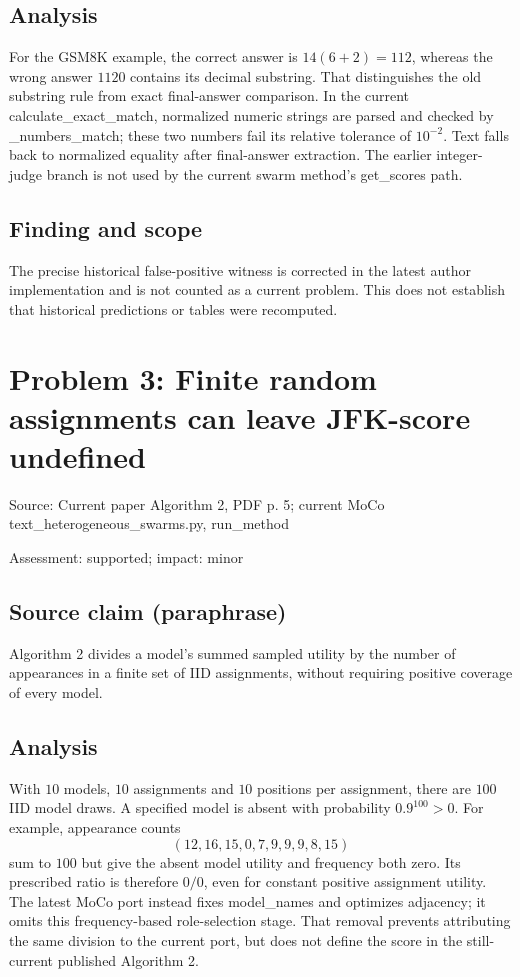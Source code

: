 \documentclass[11pt]{article}
\begin{document}
\subsection*{Analysis}

For the GSM8K example, the correct answer is \(14(6+2)=112\), whereas the wrong answer \(1120\) contains its decimal substring. That distinguishes the old substring rule from exact final-answer comparison. In the current calculate\_exact\_match, normalized numeric strings are parsed and checked by \_numbers\_match; these two numbers fail its relative tolerance of \(10^{-2}\). Text falls back to normalized equality after final-answer extraction. The earlier integer-judge branch is not used by the current swarm method’s get\_scores path.

\subsection*{Finding and scope}

The precise historical false-positive witness is corrected in the latest author implementation and is not counted as a current problem. This does not establish that historical predictions or tables were recomputed.

\section*{Problem 3: Finite random assignments can leave JFK-score undefined}

Source: Current paper Algorithm 2, PDF p. 5; current MoCo text\_heterogeneous\_swarms.py, run\_method

Assessment: supported; impact: minor

\subsection*{Source claim (paraphrase)}

Algorithm 2 divides a model’s summed sampled utility by the number of appearances in a finite set of IID assignments, without requiring positive coverage of every model.

\subsection*{Analysis}

With \(10\) models, \(10\) assignments and \(10\) positions per assignment, there are \(100\) IID model draws. A specified model is absent with probability \(0.9^{100}>0\). For example, appearance counts \[(12,16,15,0,7,9,9,9,8,15)\] sum to \(100\) but give the absent model utility and frequency both zero. Its prescribed ratio is therefore \(0/0\), even for constant positive assignment utility. The latest MoCo port instead fixes model\_names and optimizes adjacency; it omits this frequency-based role-selection stage. That removal prevents attributing the same division to the current port, but does not define the score in the still-current published Algorithm 2.
\end{document}
